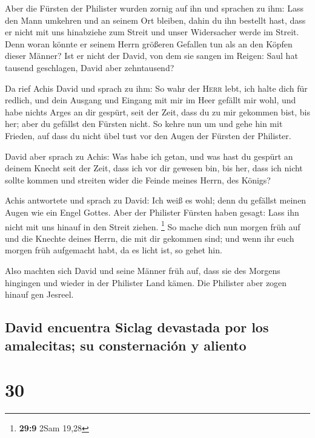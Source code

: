  Aber die Fürsten der Philister wurden zornig auf ihn und
sprachen zu ihm: Lass den Mann umkehren und an seinem Ort bleiben, dahin
du ihn bestellt hast, dass er nicht mit uns hinabziehe zum Streit und
unser Widersacher werde im Streit. Denn woran könnte er seinem Herrn
größeren Gefallen tun als an den Köpfen dieser Männer? 
Ist er nicht der David, von dem sie sangen im Reigen: Saul hat tausend
geschlagen, David aber zehntausend?

 Da rief Achis David und sprach zu ihm: So wahr der
\textsc{Herr} lebt, ich halte dich für redlich, und dein Ausgang und
Eingang mit mir im Heer gefällt mir wohl, und habe nichts Arges an dir
gespürt, seit der Zeit, dass du zu mir gekommen bist, bis her; aber du
gefällst den Fürsten nicht.  So kehre nun um und gehe hin
mit Frieden, auf dass du nicht übel tust vor den Augen der Fürsten der
Philister.

 David aber sprach zu Achis: Was habe ich getan, und was
hast du gespürt an deinem Knecht seit der Zeit, dass ich vor dir gewesen
bin, bis her, dass ich nicht sollte kommen und streiten wider die Feinde
meines Herrn, des Königs?

 Achis antwortete und sprach zu David: Ich weiß es wohl;
denn du gefällst meinen Augen wie ein Engel Gottes. Aber der Philister
Fürsten haben gesagt: Lass ihn nicht mit uns hinauf in den Streit
ziehen. \footnote{\textbf{29:9} 2Sam 19,28}  So mache
dich nun morgen früh auf und die Knechte deines Herrn, die mit dir
gekommen sind; und wenn ihr euch morgen früh aufgemacht habt, da es
licht ist, so gehet hin.

 Also machten sich David und seine Männer früh auf, dass
sie des Morgens hingingen und wieder in der Philister Land kämen. Die
Philister aber zogen hinauf gen Jesreel.

\hypertarget{david-encuentra-siclag-devastada-por-los-amalecitas-su-consternaciuxf3n-y-aliento}{%
\subsection{David encuentra Siclag devastada por los amalecitas; su
consternación y
aliento}\label{david-encuentra-siclag-devastada-por-los-amalecitas-su-consternaciuxf3n-y-aliento}}

\hypertarget{section-29}{%
\section{30}\label{section-29}}


